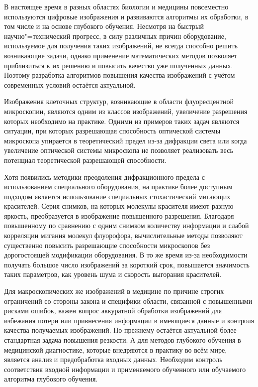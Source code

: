 
{\actuality} 

В настоящее время в разных областях биологии и медицины повсеместно используются цифровые изображения и развиваются алгоритмы их обработки, в том числе и на основе глубокого обучения. Несмотря на быстрый научно"=технический прогресс, в силу различных причин оборудование, используемое для получения таких изображений, не всегда способно решить возникающие задачи, однако применение математических методов позволяет приблизиться к их решению и повысить качество уже полученных данных. Поэтому разработка алгоритмов повышения качества изображений с учётом современных условий остаётся актуальной.

Изображения клеточных структур, возникающие в области флуоресцентной микроскопии, являются одним из классов изображений, увеличение разрешения которых необходимо на практике. Одними из примеров таких задач являются ситуации, при которых разрешающая способность оптической системы микроскопа упирается в теоретический предел из-за дифракции света или когда увеличение оптической системы микроскопа не позволяет реализовать весь потенциал теоретической разрешающей способности.

Хотя появились методики преодоления дифракционного предела с использованием специального оборудования, на практике более доступным подходом является использование специальных стохастический мигающих красителей. Серия снимков, на которых молекулы красителя имеют разную яркость, преобразуется в изображение повышенного разрешения. Благодаря повышенному по сравнению с одним снимком количеству информации и слабой корреляции мигания молекул флуорофора, вычислительные методы позволяют существенно повысить разрешающие способности микроскопов без дорогостоящей модификации оборудования. В то же время из-за необходимости получать большое число изображений за короткий срок, повышается значимость таких параметров, как уровень шума и скорость выгорания красителей.

Для макроскопических же изображений в медицине по причине строгих ограничений со стороны закона и специфики области, связанной с повышенными рисками ошибок, важен вопрос аккуратной обработки изображений для избежания потери или привнесения информации в имеющиеся данные и контроля качества получаемых изображений. По-прежнему остаётся актуальной более стандартная задача повышения резкости. А для методов глубокого обучения в медицинской диагностике, которые внедряются в практику во всём мире, является анализ и предобработка входных данных. Необходим контроль соответствия входной информации и применяемого обученного или обучаемого алгоритма глубокого обучения.

